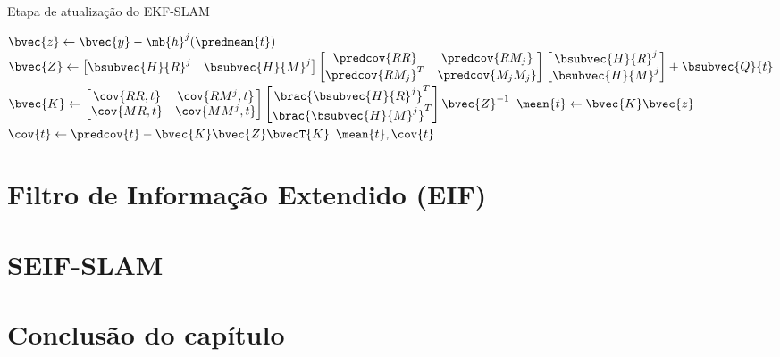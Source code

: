 \begin{algorithm}[h]
  \caption{Etapa de atualização do EKF-SLAM}
  \label{alg:ekf-slam-update}
\begin{algorithmic}[1]
  \State $\bvec{z} \gets \bvec{y} - \mb{h}^j(\predmean{t})$
  \State $\bvec{Z} \gets \begin{bmatrix}
    \bsubvec{H}{R}^j & \bsubvec{H}{M}^j
  \end{bmatrix}
  \begin{bmatrix}
    \predcov{RR} & \predcov{RM_j} \\
    \predcov{RM_j}^T & \predcov{M_j M_j}
  \end{bmatrix}
  \begin{bmatrix}
    \bsubvec{H}{R}^j \\ \bsubvec{H}{M}^j
  \end{bmatrix} + \bsubvec{Q}{t}$
  \State $\bvec{K} \gets \begin{bmatrix} \cov{RR, t} & \cov{RM^j, t} \\ 
    \cov{MR, t} & \cov{MM^j, t} 
  \end{bmatrix}
  \begin{bmatrix}
    \brac{\bsubvec{H}{R}^j}^T \\ \brac{\bsubvec{H}{M}^j}^T
  \end{bmatrix} \bvec{Z}^{-1}$
  \State $\mean{t} \gets \bvec{K} \bvec{z}$
  \State $\cov{t} \gets \predcov{t} - \bvec{K}\bvec{Z}\bvecT{K}$
  \State \Return $\mean{t}, \cov{t}$
  \EndProcedure
\end{algorithmic}
\end{algorithm}

\section{Filtro de Informação Extendido (EIF)}

\section{SEIF-SLAM}

\section{Conclusão do capítulo}